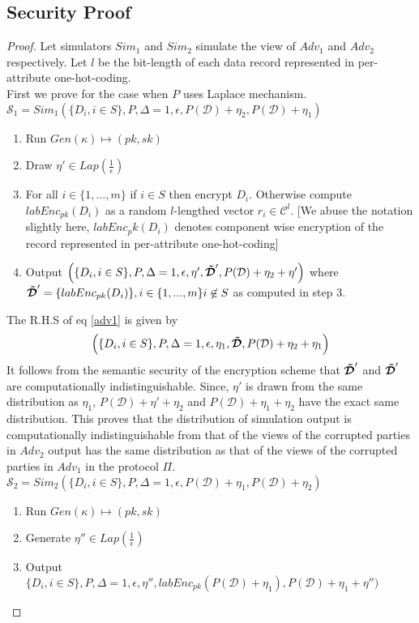 \subsection{Security Proof}
\begin{proof}
Let simulators $Sim_1$ and $Sim_2$ simulate the view of ${Adv}_1$ and $Adv_2$ respectively. 
Let $l$ be the bit-length of each data record represented in per-attribute one-hot-coding. \\
First we prove for the case when $P$ uses Laplace mechanism.
$\mathcal{S}_1=Sim_1(\{D_i, i \in S\}, P,\Delta=1,\epsilon, P(\mathcal{D})+\eta_2,P(\mathcal{D})+\eta_1)$
\begin{enumerate}\item Run $Gen(\kappa)\mapsto (pk,sk)$ 
\item Draw $\eta' \in Lap(\frac{1}{\epsilon})$
\item For all $i \in \{1,...,m\}$ if $i \in S$ then encrypt $D_i$. 
Otherwise compute $labEnc_{pk}(D_i)$ as a random $l$-lengthed vector $r_i \in \mathcal{C}^l$. [We abuse the notation slightly here, $labEnc_pk(D_i)$ denotes component wise encryption of the record represented in per-attribute one-hot-coding]
\item Output $\Big(\{D_i, i \in S\},P,\Delta=1,\epsilon,\eta',\boldsymbol{\tilde{\mathcal{D}}}',P(\mathcal{D})+\eta_2+\eta'\Big)$ where $\boldsymbol{\tilde{\mathcal{D}}}'=\{labEnc_{pk}(D_i)\},i \in \{1,...,m\} i \not \in S$ as computed in step 3.
\end{enumerate}
The R.H.S of eq \ref{adv1}  is given by 
\begin{gather}\Big(\{D_i, i \in S\},P,\Delta=1,\epsilon, \eta_1,\boldsymbol{\tilde{\mathcal{D}}},P(\mathcal{D})+\eta_2+\eta_1\Big)\end{gather}
It follows from the semantic security of the encryption scheme that $\boldsymbol{\tilde{\mathcal{D}}}'$ and $\boldsymbol{\tilde{\mathcal{D}}}'$ are computationally indistinguishable.
Since, $\eta'$ is drawn from the same distribution as $\eta_1$, $P(\mathcal{D})+\eta'+\eta_2$ and $P(\mathcal{D})+\eta_1+\eta_2$ have the exact same distribution. This proves that the distribution of simulation output is computationally indistinguishable from that of the views of the corrupted parties in $Adv_2$
output has the same distribution as that of the views of the corrupted parties in $Adv_1$ in the
protocol $\Pi$.\\
$\mathcal{S}_2=Sim_2(\{D_i, i \in S\},P,\Delta=1,\epsilon,P(\mathcal{D})+\eta_1,P(\mathcal{D})+\eta_2)$
\begin{enumerate}\item Run $Gen(\kappa)\mapsto (pk,sk)$ \item Generate $\eta'' \in Lap(\frac{1}{\epsilon})$ \item Output $\Big\{D_i, i \in S\},P,\Delta=1,\epsilon, \eta'', labEnc_{pk}(P(\mathcal{D})+\eta_1), P(\mathcal{D})+\eta_1+\eta''\Big)$

\end{enumerate}
\end{proof}
